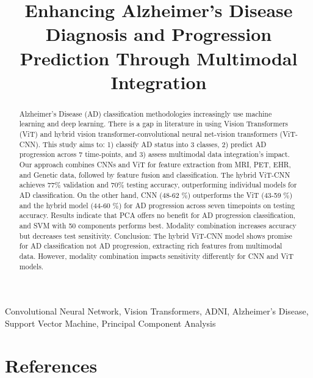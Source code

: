 \documentclass[journal,twoside,web]{ieeecolor}
\begin{document}
\title{Enhancing Alzheimer's Disease Diagnosis and Progression Prediction Through Multimodal Integration}


\maketitle

\begin{abstract}
Alzheimer’s Disease (AD) classification methodologies increasingly use machine learning and deep learning. There is a gap in literature in using Vision Transformers (ViT) and hybrid vision transformer-convolutional neural net-vision transformers (ViT-CNN). This study aims to: 1) classify AD status into 3 classes, 2) predict AD progression across 7 time-points, and 3) assess multimodal data integration's impact. Our approach combines CNNs and ViT for feature extraction from MRI, PET, EHR, and Genetic data, followed by feature fusion and classification. The hybrid ViT-CNN achieves 77\% validation and 70\% testing accuracy, outperforming individual models for AD classification. On the other hand, CNN (48-62 \%) outperforms the ViT (43-59 \%)  and the hybrid model (44-60 \%) for AD progression across seven timepoints on testing accuracy.  
Results indicate that PCA offers no benefit for AD progression classification, and SVM with 50 components performs best. Modality combination increases accuracy but decreases test sensitivity. Conclusion: The hybrid ViT-CNN model shows promise for AD classification not AD progression, extracting rich features from multimodal data. However, modality combination impacts sensitivity differently for CNN and ViT models.
\end{abstract}

\begin{IEEEkeywords}
Convolutional Neural Network, Vision Transformers, ADNI, Alzheimer's Disease, Support Vector Machine, Principal Component Analysis\\
\end{IEEEkeywords}


\vspace{-3mm}

% 


\vspace{-3mm}


\vspace{-3mm}


\vspace{-3mm}


\vspace{-3mm}

\section{References}


\end{document}
